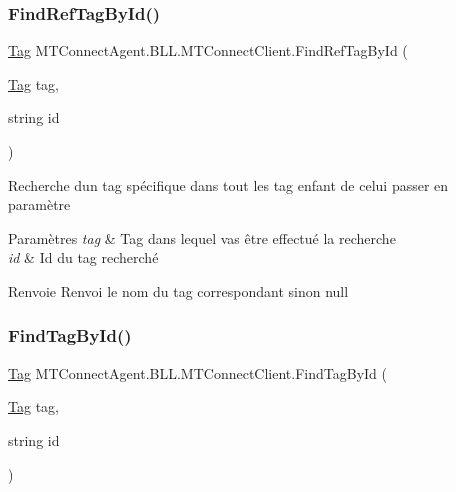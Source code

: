 \subsubsection{\texorpdfstring{Find\+Ref\+Tag\+By\+Id()}{FindRefTagById()}}
{\footnotesize\ttfamily \mbox{\hyperlink{class_m_t_connect_agent_1_1_model_1_1_tag}{Tag}} M\+T\+Connect\+Agent.\+B\+L\+L.\+M\+T\+Connect\+Client.\+Find\+Ref\+Tag\+By\+Id (\begin{DoxyParamCaption}\item[{\mbox{\hyperlink{class_m_t_connect_agent_1_1_model_1_1_tag}{Tag}}}]{tag,  }\item[{string}]{id }\end{DoxyParamCaption})\hspace{0.3cm}{\ttfamily [inline]}}



Recherche d\textquotesingle{}un tag spécifique dans tout les tag enfant de celui passer en paramètre 


\begin{DoxyParams}{Paramètres}
{\em tag} & Tag dans lequel vas être effectué la recherche\\
\hline
{\em id} & Id du tag recherché\\
\hline
\end{DoxyParams}
\begin{DoxyReturn}{Renvoie}
Renvoi le nom du tag correspondant sinon null
\end{DoxyReturn}
\mbox{\label{class_m_t_connect_agent_1_1_b_l_l_1_1_m_t_connect_client_a0deda7ea94d3370139eb1851c1e58bf8}} 
\subsubsection{\texorpdfstring{Find\+Tag\+By\+Id()}{FindTagById()}}
{\footnotesize\ttfamily \mbox{\hyperlink{class_m_t_connect_agent_1_1_model_1_1_tag}{Tag}} M\+T\+Connect\+Agent.\+B\+L\+L.\+M\+T\+Connect\+Client.\+Find\+Tag\+By\+Id (\begin{DoxyParamCaption}\item[{\mbox{\hyperlink{class_m_t_connect_agent_1_1_model_1_1_tag}{Tag}}}]{tag,  }\item[{string}]{id }\end{DoxyParamCaption})\hspace{0.3cm}{\ttfamily [inline]}}



